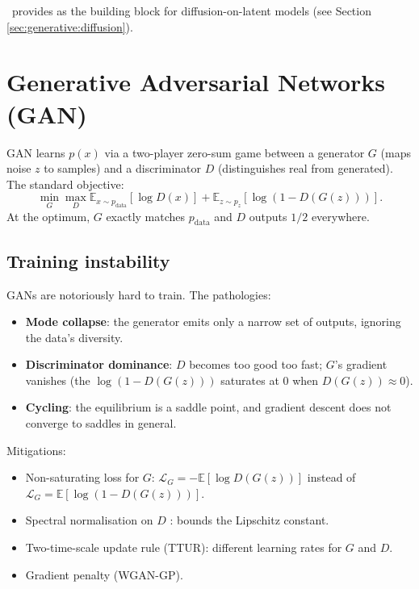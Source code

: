 \Lucid\ provides  as the building block for
diffusion-on-latent models (see Section
\ref{sec:generative:diffusion}).

\section{Generative Adversarial Networks (GAN)}
\label{sec:generative:gan}

GAN \cite{goodfellow_gan_2014} learns $p(x)$ via a two-player
zero-sum game between a generator $G$ (maps noise $z$ to
samples) and a discriminator $D$ (distinguishes real from
generated). The standard objective:
\[
  \min_G \max_D \mathbb{E}_{x \sim p_{\text{data}}}[\log D(x)] + \mathbb{E}_{z \sim p_z}[\log(1 - D(G(z)))].
\]
At the optimum, $G$ exactly matches $p_{\text{data}}$ and $D$
outputs $1/2$ everywhere.

\subsection{Training instability}
\label{ssec:generative:gan_instability}

GANs are notoriously hard to train. The pathologies:
\begin{itemize}
  \item \textbf{Mode collapse}: the generator emits only a
    narrow set of outputs, ignoring the data's diversity.
  \item \textbf{Discriminator dominance}: $D$ becomes too good
    too fast; $G$'s gradient vanishes (the $\log(1 - D(G(z)))$
    saturates at 0 when $D(G(z)) \approx 0$).
  \item \textbf{Cycling}: the equilibrium is a saddle point,
    and gradient descent does not converge to saddles in
    general.
\end{itemize}

Mitigations:
\begin{itemize}
  \item Non-saturating loss for $G$:
    $\mathcal{L}_G = -\mathbb{E}[\log D(G(z))]$ instead of
    $\mathcal{L}_G = \mathbb{E}[\log(1 - D(G(z)))]$.
  \item Spectral normalisation on $D$
    \cite{miyato_specnorm_2018}: bounds the Lipschitz constant.
  \item Two-time-scale update rule (TTUR): different learning
    rates for $G$ and $D$.
  \item Gradient penalty (WGAN-GP).
\end{itemize}

